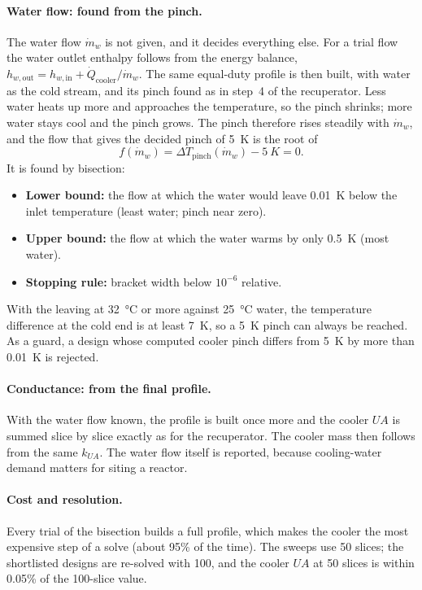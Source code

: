 \paragraph{Water flow: found from the pinch.} The water flow $\dot m_w$ is not given, and it decides everything else. For a trial flow the water outlet enthalpy follows from the energy balance, $h_{w,\mathrm{out}} = h_{w,\mathrm{in}} + \dot Q_\mathrm{cooler}/\dot m_w$. The same equal-duty profile is then built, with water as the cold stream, and its pinch found as in step~4 of the recuperator. Less water heats up more and approaches the \cotwo{} temperature, so the pinch shrinks; more water stays cool and the pinch grows. The pinch therefore rises steadily with $\dot m_w$, and the flow that gives the decided pinch of \SI{5}{K} is the root of
\begin{equation}
f(\dot m_w) = \Delta T_\mathrm{pinch}(\dot m_w) - \SI{5}{K} = 0 .
\end{equation}
It is found by bisection:
\begin{itemize}
  \item \textbf{Lower bound:} the flow at which the water would leave \SI{0.01}{K} below the \cotwo{} inlet temperature (least water; pinch near zero).
  \item \textbf{Upper bound:} the flow at which the water warms by only \SI{0.5}{K} (most water).
  \item \textbf{Stopping rule:} bracket width below $10^{-6}$ relative.
\end{itemize}
With the \cotwo{} leaving at \SI{32}{\celsius} or more against \SI{25}{\celsius} water, the temperature difference at the cold end is at least \SI{7}{K}, so a \SI{5}{K} pinch can always be reached. As a guard, a design whose computed cooler pinch differs from \SI{5}{K} by more than \SI{0.01}{K} is rejected.

\paragraph{Conductance: from the final profile.} With the water flow known, the profile is built once more and the cooler $UA$ is summed slice by slice exactly as for the recuperator. The cooler mass then follows from the same $k_{UA}$. The water flow itself is reported, because cooling-water demand matters for siting a reactor.

\paragraph{Cost and resolution.} Every trial of the bisection builds a full profile, which makes the cooler the most expensive step of a solve (about 95\% of the time). The sweeps use 50 slices; the shortlisted designs are re-solved with 100, and the cooler $UA$ at 50 slices is within 0.05\% of the 100-slice value.

